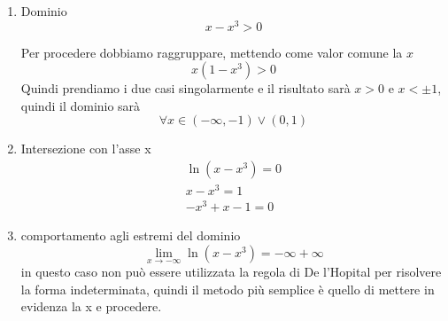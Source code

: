 \begin{enumerate}
	\item Dominio
	\begin{equation*}
		x-x^3>0
	\end{equation*}
	
	Per procedere dobbiamo raggruppare, mettendo come valor comune la $x$
	\begin{equation*}
		x(1-x^3)>0
	\end{equation*}
	Quindi prendiamo i due casi singolarmente e il risultato sarà $x>0$ e $x<\pm1$, quindi il dominio sarà
	\begin{equation*}
		\forall x\in (-\infty,-1) \vee (0,1)
	\end{equation*}
	\item Intersezione con l'asse x
		\begin{equation*}
			\begin{matrix}
				\ln\left(x-x^3\right)=0\\
				x-x^3=1\\
				-x^3+x-1=0
			\end{matrix}
		\end{equation*}
	\item comportamento agli estremi del dominio
		\begin{equation*}
			\lim_{x\to -\infty}\ln\left(x-x^3\right)=-\infty+\infty
		\end{equation*}
		in questo caso non può essere utilizzata la regola di De l'Hopital per risolvere la forma indeterminata, quindi il metodo più semplice è quello di mettere in evidenza la x e procedere.
		

\end{enumerate}
